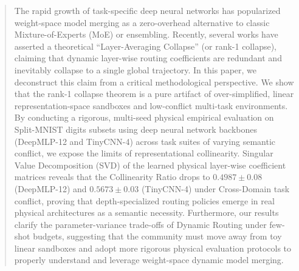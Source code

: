 \begin{abstract}
The rapid growth of task-specific deep neural networks has popularized weight-space model merging as a zero-overhead alternative to classic Mixture-of-Experts (MoE) or ensembling. Recently, several works have asserted a theoretical ``Layer-Averaging Collapse'' (or rank-1 collapse), claiming that dynamic layer-wise routing coefficients are redundant and inevitably collapse to a single global trajectory. In this paper, we deconstruct this claim from a critical methodological perspective. We show that the rank-1 collapse theorem is a pure artifact of over-simplified, linear representation-space sandboxes and low-conflict multi-task environments. By conducting a rigorous, multi-seed physical empirical evaluation on Split-MNIST digits subsets using deep neural network backbones (DeepMLP-12 and TinyCNN-4) across task suites of varying semantic conflict, we expose the limits of representational collinearity. Singular Value Decomposition (SVD) of the learned physical layer-wise coefficient matrices reveals that the Collinearity Ratio drops to $0.4987 \pm 0.08$ (DeepMLP-12) and $0.5673 \pm 0.03$ (TinyCNN-4) under Cross-Domain task conflict, proving that depth-specialized routing policies emerge in real physical architectures as a semantic necessity. Furthermore, our results clarify the parameter-variance trade-offs of Dynamic Routing under few-shot budgets, suggesting that the community must move away from toy linear sandboxes and adopt more rigorous physical evaluation protocols to properly understand and leverage weight-space dynamic model merging.
\end{abstract}
